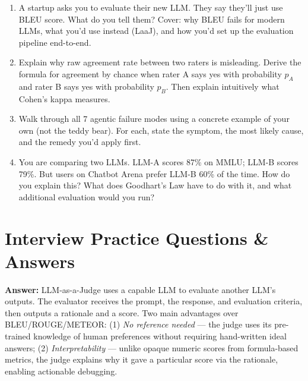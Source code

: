 \documentclass[11pt, a4paper]{article}
\begin{document}
\begin{enumerate}[leftmargin=2em]
  \item A startup asks you to evaluate their new LLM. They say they'll just use BLEU score. What do you tell them? Cover: why BLEU fails for modern LLMs, what you'd use instead (LaaJ), and how you'd set up the evaluation pipeline end-to-end.

  \item Explain why raw agreement rate between two raters is misleading. Derive the formula for agreement by chance when rater A says yes with probability $p_A$ and rater B says yes with probability $p_B$. Then explain intuitively what Cohen's kappa measures.

  \item Walk through all 7 agentic failure modes using a concrete example of your own (not the teddy bear). For each, state the symptom, the most likely cause, and the remedy you'd apply first.

  \item You are comparing two LLMs. LLM-A scores 87\% on MMLU; LLM-B scores 79\%. But users on Chatbot Arena prefer LLM-B 60\% of the time. How do you explain this? What does Goodhart's Law have to do with it, and what additional evaluation would you run?
\end{enumerate}

\newpage
\section{Interview Practice Questions \& Answers}

\begin{notebox}
\textbf{Answer:} LLM-as-a-Judge uses a capable LLM to evaluate another LLM's outputs. The evaluator receives the prompt, the response, and evaluation criteria, then outputs a rationale and a score. Two main advantages over BLEU/ROUGE/METEOR: (1) \emph{No reference needed} --- the judge uses its pre-trained knowledge of human preferences without requiring hand-written ideal answers; (2) \emph{Interpretability} --- unlike opaque numeric scores from formula-based metrics, the judge explains why it gave a particular score via the rationale, enabling actionable debugging.
\end{notebox}
\end{document}
